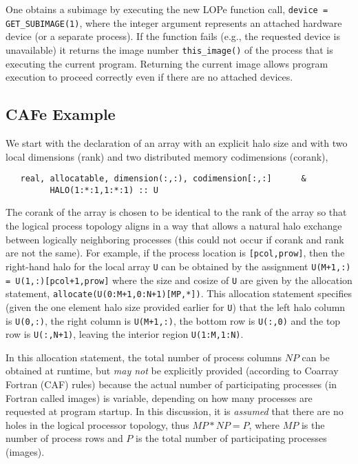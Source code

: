 One obtains a subimage by executing the new LOPe function call, \texttt{device = GET\_SUBIMAGE(1)},
where the integer argument represents an attached hardware device (or a separate process).
If the function fails (e.g., the requested device is unavailable) it returns the image number
\texttt{this\_image()} of the process that is executing the current program.  Returning the current
image allows program execution to proceed correctly even if there are no attached devices.

\subsection{CAFe Example}

We start with the declaration of an array with an explicit halo size and with two local
dimensions (rank) and two distributed memory codimensions (corank),
\begin{verbatim}
   real, allocatable, dimension(:,:), codimension[:,:]      &
         HALO(1:*:1,1:*:1) :: U
\end{verbatim}
The corank of the array is chosen to be identical to the rank of the array so that the logical
process topology aligns in a way that allows a natural halo exchange between logically neighboring
processes (this could not occur if corank and rank are not the same).  For example, if the process
location is \texttt{[pcol,prow]}, then the right-hand halo for the local array \texttt{U} can be
obtained by the assignment
\texttt{U(M+1,:) = U(1,:)[pcol+1,prow]} where the size and cosize of
\texttt{U} are given by the allocation statement,
\texttt{allocate(U(0:M+1,0:N+1)[MP,*])}.
This allocation statement specifies (given the one element halo size provided earlier for
\texttt{U}) that the left halo column is \texttt{U(0,:)}, the right column is \texttt{U(M+1,:)},
the bottom row is \texttt{U(:,0)} and the top row is \texttt{U(:,N+1)}, leaving the interior region
\texttt{U(1:M,1:N)}.

In this allocation statement, the total number of process columns $NP$ can be obtained at runtime,
but \emph{may not} be explicitly provided (according to Coarray Fortran (CAF) rules) because the actual number of
participating processes (in Fortran called images) is variable, depending on how many processes are
requested at program startup.  In this discussion, it is \emph{assumed} that there are no holes in
the logical processor topology, thus $MP*NP = P$, where $MP$ is the number of process rows and $P$
is the total number of participating processes (images).

